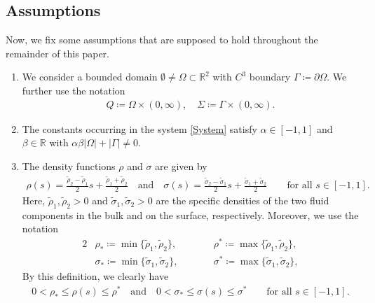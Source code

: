 \documentclass[10pt,reqno]{amsart}
\theoremstyle{remark}
\numberwithin{equation}{section}
\newcommand{\abs}[1]{| #1 |}
\newcommand{\R}{\mathbb R}
\newcommand{\del}{\partial}
\newcommand{\Om}{\Omega}
\newcommand{\Ga}{\Gamma}
\begin{document}
\medskip
\subsection{Assumptions}

Now, we fix some assumptions that are supposed to hold throughout the remainder of this paper.

\begin{enumerate}[label=\textnormal{\bfseries(A\arabic*)}]
    \item  \label{Assumption:Domain} We consider a bounded domain $\emptyset\neq \Om\subset\R^2$ with $C^3$ boundary $\Ga\coloneqq\del\Om$. We further use the notation
    \begin{align*}
        Q\coloneqq \Om\times(0,\infty), \quad\Sigma\coloneqq\Ga\times(0,\infty).
    \end{align*}
    
    \item \label{Assumption:Constants} The constants occurring in the system \eqref{System} satisfy $\alpha\in[-1,1]$ and $\beta\in \R$ with $\alpha\beta\abs{\Omega} + \abs{\Gamma} \neq 0$. 
    
    \item \label{Assumption:Density} The density functions $\rho$ and $\sigma$ are given by
    \begin{align*}
    	\rho(s) = \frac{\tilde{\rho}_2 - \tilde{\rho}_1}{2}s + \frac{\tilde{\rho}_1 + \tilde{\rho}_2}{2} \quad\text{and}\quad\sigma(s) = \frac{\tilde{\sigma}_2 - \tilde{\sigma}_1}{2}s + \frac{\tilde{\sigma}_1 + \tilde{\sigma}_2}{2} \qquad\text{for all~}s\in[-1,1].
    \end{align*}
    Here, $\tilde{\rho}_1, \tilde{\rho}_2>0$ and $\tilde{\sigma}_1, \tilde{\sigma}_2>0$ are the specific densities of the two fluid components in the bulk and on the surface, respectively. Moreover, we use the notation
    \begin{alignat*}{2}
        &\rho_\ast \coloneqq \min\{\tilde\rho_1,\tilde\rho_2\}, \qquad 
        &&\rho^\ast \coloneqq \max\{\tilde\rho_1,\tilde\rho_2\},
        \\
        &\sigma_\ast \coloneqq \min\{\tilde\sigma_1,\tilde\sigma_2\}, \qquad 
        &&\sigma^\ast \coloneqq \max\{\tilde\sigma_1,\tilde\sigma_2\},
    \end{alignat*}
    By this definition, we clearly have
    \begin{align*}
        0 < \rho_\ast \leq \rho(s) \leq \rho^\ast \quad\text{and}\quad 0 < \sigma_\ast \leq \sigma(s) \leq \sigma^\ast \qquad\text{for all~}s\in[-1,1].
    \end{align*}
    

\end{enumerate}
\end{document}
